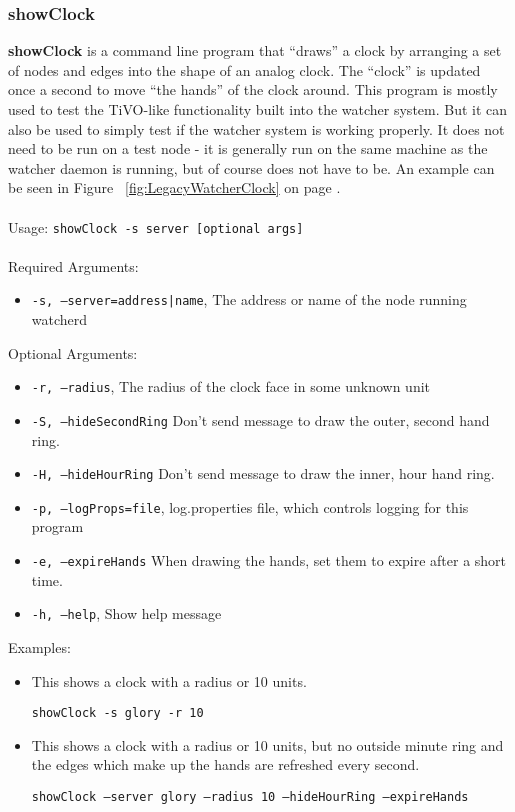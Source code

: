 \newpage
\label{showClock}
\subsubsection{showClock}

{\bf showClock} is a command line program that ``draws'' a clock by arranging a set of nodes and edges into the shape of an 
analog clock.  The ``clock'' is updated once a second to move ``the hands'' of the clock around. This program is mostly
used to test the TiVO-like functionality built into the watcher system. But it can also be used to simply test if the watcher system is working properly. It does not need to be run on a test node - it is generally run on the same machine as the watcher daemon is running, but of course does not have to be. An example can be seen in Figure ~\ref{fig:LegacyWatcherClock} on page \pageref{LegacyWatcher}.
\\\\
Usage: 
{\tt showClock -s server [optional args]}
\\\\
Required Arguments:
\begin{itemize}
\item {\tt -s, --server=address|name}, The address or name of the node running watcherd
\end{itemize}
Optional Arguments:
\begin{itemize}
\item {\tt -r, --radius}, The radius of the clock face in some unknown unit
\item {\tt -S, --hideSecondRing}        Don't send message to draw the outer, second hand ring.
\item {\tt -H, --hideHourRing}          Don't send message to draw the inner, hour hand ring.
\item {\tt -p, --logProps=file}, log.properties file, which controls logging for this program
\item {\tt -e, --expireHands}           When drawing the hands, set them to expire after a short time.
\item {\tt -h, --help}, Show help message
\end{itemize}
Examples:
\begin{itemize}
\item This shows a clock with a radius or 10 units.

{\tt showClock -s glory -r 10}

\item This shows a clock with a radius or 10 units, but no outside minute ring and the edges which make up the hands are refreshed every second.

{\tt showClock --server glory --radius 10 --hideHourRing --expireHands}

\end{itemize}
